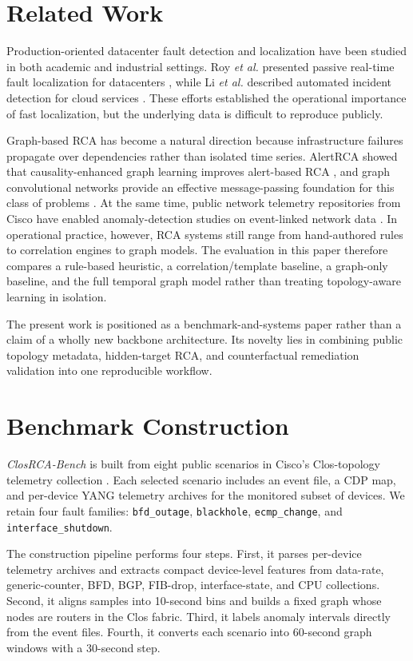 \documentclass[conference]{IEEEtran}
\begin{document}
\section{Related Work}
Production-oriented datacenter fault detection and localization have been studied in both academic and industrial settings. Roy \textit{et al.} presented passive real-time fault localization for datacenters \cite{roy2017fault}, while Li \textit{et al.} described automated incident detection for cloud services \cite{li2021mining}. These efforts established the operational importance of fast localization, but the underlying data is difficult to reproduce publicly.

Graph-based RCA has become a natural direction because infrastructure failures propagate over dependencies rather than isolated time series. AlertRCA showed that causality-enhanced graph learning improves alert-based RCA \cite{alertRCA2024}, and graph convolutional networks provide an effective message-passing foundation for this class of problems \cite{kipf2017semi}. At the same time, public network telemetry repositories from Cisco have enabled anomaly-detection studies on event-linked network data \cite{putina2018telemetry,ciscoTelemetryRepo}. In operational practice, however, RCA systems still range from hand-authored rules to correlation engines to graph models. The evaluation in this paper therefore compares a rule-based heuristic, a correlation/template baseline, a graph-only baseline, and the full temporal graph model rather than treating topology-aware learning in isolation.

The present work is positioned as a benchmark-and-systems paper rather than a claim of a wholly new backbone architecture. Its novelty lies in combining public topology metadata, hidden-target RCA, and counterfactual remediation validation into one reproducible workflow.

\section{Benchmark Construction}
\textit{ClosRCA-Bench} is built from eight public scenarios in Cisco's Clos-topology telemetry collection \cite{ciscoTelemetryRepo}. Each selected scenario includes an event file, a CDP map, and per-device YANG telemetry archives for the monitored subset of devices. We retain four fault families:
\texttt{bfd\_outage}, \texttt{blackhole}, \texttt{ecmp\_change}, and \texttt{interface\_shutdown}.

The construction pipeline performs four steps. First, it parses per-device telemetry archives and extracts compact device-level features from data-rate, generic-counter, BFD, BGP, FIB-drop, interface-state, and CPU collections. Second, it aligns samples into 10-second bins and builds a fixed graph whose nodes are routers in the Clos fabric. Third, it labels anomaly intervals directly from the event files. Fourth, it converts each scenario into 60-second graph windows with a 30-second step.
\end{document}
